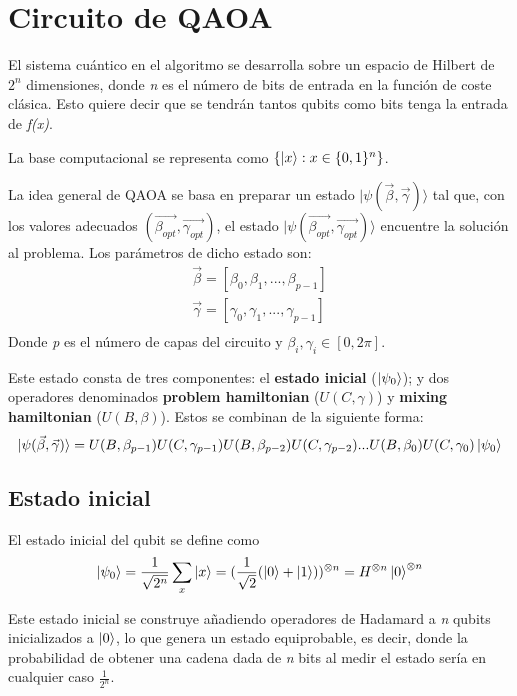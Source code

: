 \documentclass{article}
\begin{document}
\section{Circuito de QAOA}
El sistema cuántico en el algoritmo se desarrolla sobre un espacio de Hilbert de $2^n$ dimensiones, donde \textit{n} es el número de bits de entrada en la función de coste clásica. Esto quiere decir que se tendrán tantos qubits como bits tenga la entrada de \textit{f(x)}.

La base computacional se representa como $\{\ket{x} : x \in \{0, 1\}^n\}$.

La idea general de QAOA se basa en preparar un estado \(\lvert \psi(\vec{\beta}, \vec{\gamma})\rangle\) tal que, con los valores adecuados \( (\vec{\beta_{opt}}, \vec{\gamma_{opt}}) \), el estado \(\lvert\psi(\vec{\beta_{opt}}, \vec{\gamma_{opt}})\rangle\) encuentre la solución al problema. Los parámetros de dicho estado son:
\begin{align*}
  \vec{\beta} = [\beta_0, \beta_1, ..., \beta_{p-1}] \\
  \vec{\gamma} = [\gamma_0, \gamma_1, ..., \gamma_{p-1}] \\
\end{align*}
Donde \textit{p} es el número de capas del circuito y $\beta_i, \gamma_i \in{[0, 2\pi]}$.

Este estado consta de tres componentes: el \textbf{estado inicial} ($\ket{\psi_0}$); y dos operadores denominados \textbf{problem hamiltonian} ($U(C, \gamma)$) y \textbf{mixing hamiltonian} ($U(B, \beta)$).
Estos se combinan de la siguiente forma:
\[
  \lvert\psi(\vec{\beta}, \vec{\gamma})\rangle = U(B, \beta_{p-1})U(C, \gamma_{p-1})U(B, \beta_{p-2})U(C, \gamma_{p-2}) ... U(B, \beta_0)U(C, \gamma_0) \ket{\psi_0}
\]

\subsection{Estado inicial}
El estado inicial del qubit se define como
\begin{align*}
  \ket{\psi_0} = \frac{1}{\sqrt{2^n}} \sum_x\ket{x}
  = (\frac{1}{\sqrt{2}} (\ket{0} + \ket{1}))^{\otimes n}
  = H^{\otimes n} \ket{0}^{\otimes n}
\end{align*}

Este estado inicial se construye añadiendo operadores de Hadamard a \textit{n} qubits inicializados a $\ket{0}$, lo que genera un estado equiprobable, es decir, donde la probabilidad de obtener una cadena dada de \textit{n} bits al medir el estado sería en cualquier caso $\frac{1}{2^n}$.
\end{document}
